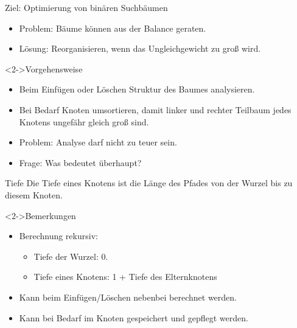 \begin{frame}
    \begin{block}{Ziel: Optimierung von binären Suchbäumen}
        \begin{itemize}
            \item Problem: Bäume können aus der Balance geraten.
            \item Lösung: Reorganisieren, wenn das Ungleichgewicht zu groß wird.
        \end{itemize}
    \end{block}
    \begin{block}<2->{Vorgehensweise}
        \begin{itemize}
            \item Beim Einfügen oder Löschen Struktur des Baumes analysieren.
            \item Bei Bedarf Knoten umsortieren, damit linker und rechter Teilbaum
                  jedes Knotens ungefähr gleich groß sind.
            \item Problem: Analyse darf nicht zu teuer sein.
            \item Frage: Was bedeutet überhaupt?
        \end{itemize}
    \end{block}
\end{frame}

\begin{frame}
    \begin{defblock}{Tiefe}
        Die Tiefe eines Knotens ist die Länge des Pfades von der Wurzel bis zu diesem Knoten.
    \end{defblock}
    \begin{block}<2->{Bemerkungen}
        \begin{itemize}
            \item Berechnung rekursiv:
            \begin{itemize}
                \item Tiefe der Wurzel: $0$.
                \item Tiefe eines Knotens: 1 + Tiefe des Elternknotens
            \end{itemize}
            \item Kann beim Einfügen/Löschen nebenbei berechnet werden.
            \item Kann bei Bedarf im Knoten gespeichert und gepflegt werden.
        \end{itemize}
    \end{block}
\end{frame}

